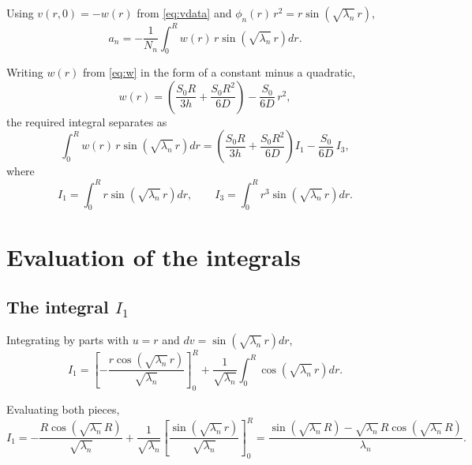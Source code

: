 \documentclass[11pt,a4paper]{article}
\begin{document}
Using $v(r,0) = -w(r)$ from \eqref{eq:vdata} and
$\phi_{n}(r)\,r^{2} = r\sin\!\left(\sqrt{\lambda_{n}}\,r\right)$,
\begin{equation}
a_{n} = -\frac{1}{N_{n}}
\int_{0}^{R} w(r)\, r\sin\!\left(\sqrt{\lambda_{n}}\,r\right) dr .
\label{eq:an-def}
\end{equation}

Writing $w(r)$ from \eqref{eq:w} in the form of a constant minus a quadratic,
\begin{equation}
w(r) = \left(\frac{S_{0}R}{3h} + \frac{S_{0}R^{2}}{6D}\right)
- \frac{S_{0}}{6D}\,r^{2} ,
\end{equation}
the required integral separates as
\begin{equation}
\int_{0}^{R} w(r)\, r\sin\!\left(\sqrt{\lambda_{n}}\,r\right) dr
= \left(\frac{S_{0}R}{3h} + \frac{S_{0}R^{2}}{6D}\right) I_{1}
- \frac{S_{0}}{6D}\, I_{3} ,
\label{eq:wsplit}
\end{equation}
where
\begin{equation}
I_{1} = \int_{0}^{R} r\sin\!\left(\sqrt{\lambda_{n}}\,r\right) dr ,
\qquad
I_{3} = \int_{0}^{R} r^{3}\sin\!\left(\sqrt{\lambda_{n}}\,r\right) dr .
\end{equation}

\section{Evaluation of the integrals}

\subsection{The integral \texorpdfstring{$I_{1}$}{I1}}

Integrating by parts with $u = r$ and
$dv = \sin\!\left(\sqrt{\lambda_{n}}\,r\right) dr$,
\begin{equation}
I_{1}
= \left[-\frac{r\cos\!\left(\sqrt{\lambda_{n}}\,r\right)}{\sqrt{\lambda_{n}}}\right]_{0}^{R}
+ \frac{1}{\sqrt{\lambda_{n}}}\int_{0}^{R}\cos\!\left(\sqrt{\lambda_{n}}\,r\right) dr .
\end{equation}

Evaluating both pieces,
\begin{equation}
I_{1}
= -\frac{R\cos\!\left(\sqrt{\lambda_{n}}\,R\right)}{\sqrt{\lambda_{n}}}
+ \frac{1}{\sqrt{\lambda_{n}}}
\left[\frac{\sin\!\left(\sqrt{\lambda_{n}}\,r\right)}{\sqrt{\lambda_{n}}}\right]_{0}^{R}
= \frac{\sin\!\left(\sqrt{\lambda_{n}}\,R\right)
- \sqrt{\lambda_{n}}\,R\cos\!\left(\sqrt{\lambda_{n}}\,R\right)}{\lambda_{n}} .
\end{equation}
\end{document}
